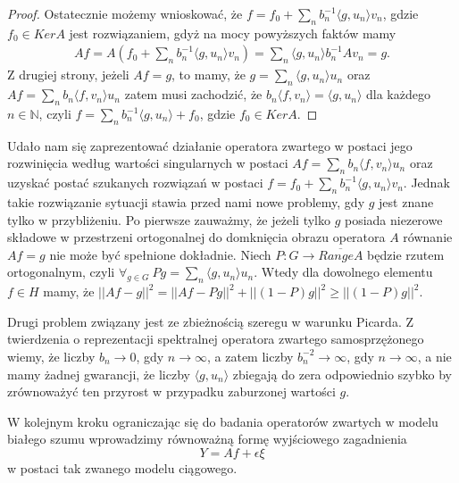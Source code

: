 \documentclass[man,mfiu]{mgrwms}
\begin{document}
\begin{proof}
Ostatecznie możemy wnioskować, że $f=f_0+\sum_nb_n^{-1}\langle g, u_n\rangle v_n$, gdzie $f_0\in KerA$ jest rozwiązaniem, gdyż na mocy powyższych faktów mamy
\begin{displaymath}
\begin{split}
Af=A(f_0+\sum_nb_n^{-1}\langle g, u_n\rangle v_n)=\sum_n\langle g, u_n\rangle b_n^{-1}Av_n=g.
\end{split}
\end{displaymath}
Z drugiej strony, jeżeli $Af=g$, to mamy, że $g=\sum_n\langle g, u_n\rangle u_n$ oraz $Af=\sum_n b_n\langle f, v_n\rangle u_n$ zatem musi zachodzić, że $b_n\langle f, v_n\rangle = \langle g,u_n\rangle $ dla każdego $n\in \mathbb{N}$, czyli $f=\sum_n b_n^{-1}\langle g,u_n\rangle +f_0$, gdzie $f_0\in KerA$.
\end{proof}

Udało nam się zaprezentować działanie operatora zwartego w postaci jego rozwinięcia według wartości singularnych w postaci $Af=\sum_nb_n\langle f, v_n\rangle u_n$ oraz uzyskać postać szukanych rozwiązań w postaci $f=f_0+\sum_nb_n^{-1}\langle g, u_n\rangle v_n$. Jednak takie rozwiązanie sytuacji stawia przed nami nowe problemy, gdy $g$ jest znane tylko w przybliżeniu. Po pierwsze zauważmy, że jeżeli tylko $g$ posiada niezerowe składowe w przestrzeni ortogonalnej do domknięcia obrazu operatora $A$ równanie $Af=g$ nie może być spełnione dokładnie. Niech $P\colon G\to \overline{RangeA}$ będzie rzutem ortogonalnym, czyli $\forall_{g\in G}\ Pg=\sum_n\langle g,u_n\rangle u_n$. Wtedy dla dowolnego elementu $f\in H$ mamy, że $||Af-g||^2=||Af-Pg||^2+||(1-P)g||^2\geq ||(1-P)g||^2$.

Drugi problem związany jest ze zbieżnością szeregu w warunku Picarda. Z twierdzenia o reprezentacji spektralnej operatora zwartego samosprzężonego wiemy, że liczby $b_n\to 0$, gdy $n\to \infty$, a zatem liczby $b_n^{-2}\to \infty$, gdy $n \to \infty$, a nie mamy żadnej gwarancji, że liczby $\langle g,u_n\rangle$ zbiegają do zera odpowiednio szybko by zrównoważyć ten przyrost w przypadku zaburzonej wartości $g$.


W kolejnym kroku ograniczając się do badania operatorów zwartych w modelu białego szumu wprowadzimy równoważną formę wyjściowego zagadnienia 
\begin{displaymath}
Y=Af+\epsilon\xi
\end{displaymath}
w postaci tak zwanego modelu ciągowego.\\
\end{document}
